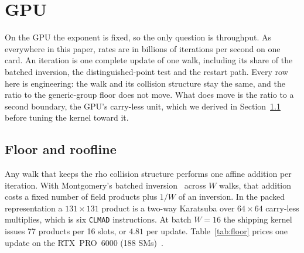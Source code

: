 \section{GPU}
\label{sec:gpu}

On the GPU the exponent is fixed, so the only question is throughput.
As everywhere in this paper, rates are in billions of iterations per
second on one card. An iteration is one complete update of one walk,
including its share of the batched inversion, the distinguished-point
test and the restart path. Every
row here is engineering: the walk and its collision structure stay the
same, and the ratio to the generic-group floor does not move. What
does move is the ratio to a second boundary, the GPU's carry-less
unit, which we derived in Section~\ref{sec:floor} before tuning the
kernel toward it.





\subsection{Floor and roofline}
\label{sec:floor}

Any walk that keeps the rho collision structure performs one affine
addition per iteration. With Montgomery's batched
inversion~\cite{montgomery1987} across $W$ walks, that addition costs
a fixed number of field products plus $1/W$ of an inversion. In the
packed representation a $131\times131$ product is a two-way Karatsuba
over $64\times64$ carry-less multiplies, which is six \texttt{CLMAD}
instructions. At batch $W=16$ the shipping kernel issues 77 products
per 16 slots, or $4.81$ per update. Table~\ref{tab:floor} prices one
update on the RTX~PRO~6000 (188 SMs)~.

